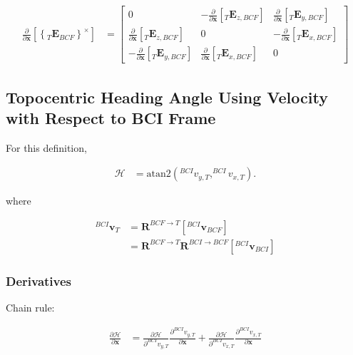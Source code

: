 \documentclass[]{article}
\newcommand{\vb}[1]{\bm{#1}} %
\newcommand{\pd}[2]{\frac{\partial #1}{\partial #2}} %
\begin{document}
\begin{align}
	\pd{}{\vb{x}} \left[ \left\{ _T \vb{E}_{BCF} \right\}^{\times} \right] &= \left[ \begin{array}{ccc} 
	0 & - \pd{}{\vb{x}} \left[ _T \vb{E}_{z, BCF} \right] & \pd{}{\vb{x}} \left[ _T \vb{E}_{y, BCF} \right] \\
	\pd{}{\vb{x}} \left[ _T \vb{E}_{z, BCF} \right] & 0 & - \pd{}{\vb{x}} \left[ _T \vb{E}_{x, BCF} \right] \\
	- \pd{}{\vb{x}} \left[ _T \vb{E}_{y, BCF} \right] & \pd{}{\vb{x}} \left[ _T \vb{E}_{x, BCF} \right] & 0 \end{array} \right]
\end{align}

\subsection{Topocentric Heading Angle Using Velocity with Respect to BCI Frame}

For this definition,

\begin{align}
\mathcal{H} &= \mathrm{atan2} \left( ^{BCI} {v}_{y, T}, ^{BCI} {v}_{x, T} \right).
\end{align}

\noindent where

\begin{align}
	^{BCI} \vb{v}_T &= \vb{R}^{BCF \rightarrow T} \left[ ^{BCI} \vb{v}_{BCF} \right] \\
	&= \vb{R}^{BCF \rightarrow T} \vb{R}^{BCI \rightarrow BCF} \left[ ^{BCI} \vb{v}_{BCI} \right]
\end{align}

\subsubsection{Derivatives}

Chain rule:

\begin{align}
\pd{\mathcal{H}}{\vb{x}} &= \pd{\mathcal{H}}{^{BCI} v_{y, T}} \pd{^{BCI} v_{y, T}}{\vb{x}} + \pd{\mathcal{H}}{^{BCI} v_{x, T}} \pd{^{BCI} v_{x, T}}{\vb{x}}  
\end{align}
\end{document}
